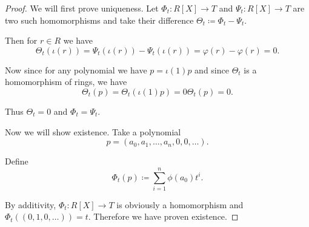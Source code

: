 \begin{proof}
  We will first prove uniqueness. Let \( \Phi_t: R[X] \to T \) and \( \Psi_t: R[X] \to T \) are two such homomorphisms and take their difference \( \Theta_t \coloneqq \Phi_t - \Psi_t \).

  Then for \( r \in R \) we have
  \begin{equation*}
    \Theta_t(\iota(r)) = \Psi_t(\iota(r)) - \Psi_t(\iota(r)) = \varphi(r) - \varphi(r) = 0.
  \end{equation*}

  Now since for any polynomial we have \( p = \iota(1) p \) and since \( \Theta_t \) is a homomorphism of rings, we have
  \begin{equation*}
    \Theta_t(p) = \Theta_t(\iota(1) p) = 0 \Theta_t(p) = 0.
  \end{equation*}

  Thus \( \Theta_t = 0 \) and \( \Phi_t = \Psi_t \).

  Now we will show existence. Take a polynomial
  \begin{equation*}
    p = (a_0, a_1, \ldots, a_n, 0, 0, \ldots).
  \end{equation*}

  Define
  \begin{equation*}
    \Phi_t(p) \coloneqq \sum_{i=1}^n \phi(a_0) t^i.
  \end{equation*}

  By additivity, \( \Phi_t: R[X] \to T \) is obviously a homomorphism and \( \Phi_t((0, 1, 0, \ldots)) = t \). Therefore we have proven existence.
\end{proof}

